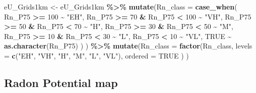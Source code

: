 \documentclass[
  12pt,
]{article}
\newenvironment{Shaded}{\begin{snugshade}}{\end{snugshade}}
\newcommand{\DataTypeTok}[1]{\textcolor[rgb]{0.13,0.29,0.53}{#1}}
\newcommand{\DecValTok}[1]{\textcolor[rgb]{0.00,0.00,0.81}{#1}}
\newcommand{\KeywordTok}[1]{\textcolor[rgb]{0.13,0.29,0.53}{\textbf{#1}}}
\newcommand{\NormalTok}[1]{#1}
\newcommand{\OperatorTok}[1]{\textcolor[rgb]{0.81,0.36,0.00}{\textbf{#1}}}
\newcommand{\OtherTok}[1]{\textcolor[rgb]{0.56,0.35,0.01}{#1}}
\newcommand{\StringTok}[1]{\textcolor[rgb]{0.31,0.60,0.02}{#1}}
\begin{document}
\begin{Shaded}
\begin{Highlighting}[]
\NormalTok{  eU\_Grids1km \textless{}{-}}\StringTok{ }\NormalTok{eU\_Grids1km }\OperatorTok{\%\textgreater{}\%}
\StringTok{    }\KeywordTok{mutate}\NormalTok{(}\DataTypeTok{Rn\_class =} \KeywordTok{case\_when}\NormalTok{(}
\NormalTok{      Rn\_P75 }\OperatorTok{\textgreater{}=}\StringTok{ }\DecValTok{100}              \OperatorTok{\textasciitilde{}}\StringTok{ "EH"}\NormalTok{,}
\NormalTok{      Rn\_P75 }\OperatorTok{\textgreater{}=}\StringTok{ }\DecValTok{70} \OperatorTok{\&}\StringTok{ }\NormalTok{Rn\_P75 }\OperatorTok{\textless{}}\StringTok{ }\DecValTok{100} \OperatorTok{\textasciitilde{}}\StringTok{ "VH"}\NormalTok{,}
\NormalTok{      Rn\_P75 }\OperatorTok{\textgreater{}=}\StringTok{ }\DecValTok{50} \OperatorTok{\&}\StringTok{ }\NormalTok{Rn\_P75 }\OperatorTok{\textless{}}\StringTok{  }\DecValTok{70} \OperatorTok{\textasciitilde{}}\StringTok{  "H"}\NormalTok{,}
\NormalTok{      Rn\_P75 }\OperatorTok{\textgreater{}=}\StringTok{ }\DecValTok{30} \OperatorTok{\&}\StringTok{ }\NormalTok{Rn\_P75 }\OperatorTok{\textless{}}\StringTok{  }\DecValTok{50} \OperatorTok{\textasciitilde{}}\StringTok{  "M"}\NormalTok{,                 }
\NormalTok{      Rn\_P75 }\OperatorTok{\textgreater{}=}\StringTok{ }\DecValTok{10} \OperatorTok{\&}\StringTok{ }\NormalTok{Rn\_P75 }\OperatorTok{\textless{}}\StringTok{  }\DecValTok{30} \OperatorTok{\textasciitilde{}}\StringTok{  "L"}\NormalTok{,                }
\NormalTok{      Rn\_P75 }\OperatorTok{\textless{}}\StringTok{  }\DecValTok{10}                \OperatorTok{\textasciitilde{}}\StringTok{ "VL"}\NormalTok{,}
      \OtherTok{TRUE} \OperatorTok{\textasciitilde{}}\StringTok{ }\KeywordTok{as.character}\NormalTok{(Rn\_P75)}
\NormalTok{    )}
\NormalTok{    ) }\OperatorTok{\%\textgreater{}\%}
\StringTok{    }\KeywordTok{mutate}\NormalTok{(}\DataTypeTok{Rn\_class =} \KeywordTok{factor}\NormalTok{(Rn\_class, }
                             \DataTypeTok{levels =} \KeywordTok{c}\NormalTok{(}\StringTok{"EH"}\NormalTok{, }\StringTok{"VH"}\NormalTok{, }\StringTok{"H"}\NormalTok{, }\StringTok{"M"}\NormalTok{, }\StringTok{"L"}\NormalTok{, }\StringTok{"VL"}\NormalTok{),}
                             \DataTypeTok{ordered =} \OtherTok{TRUE}
\NormalTok{    )}
\NormalTok{    )}
\end{Highlighting}
\end{Shaded}

\hypertarget{radon-potential-map}{%
\subsection{Radon Potential map}\label{radon-potential-map}}
\end{document}
